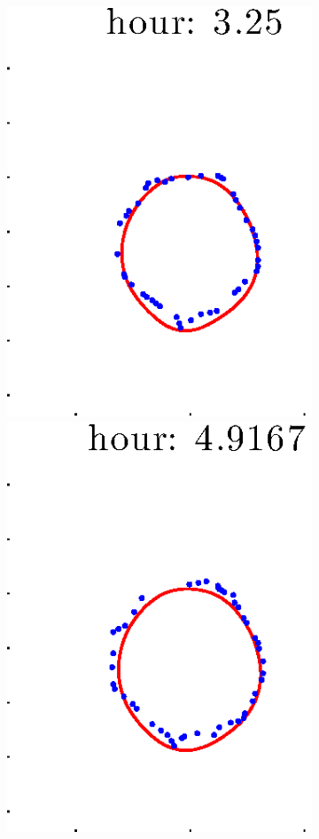 \documentclass[12pt]{article}
\begin{document}
\begin{figure}[h!]
\begin{subfigure}[b]{.3\textwidth}
		\includegraphics[height=.15\textheight]{Pos14exp8/full/full3.eps}
		\includegraphics[height=.15\textheight]{Pos14exp8/full/full4.eps}

\end{subfigure}
\end{figure}
\end{document}
